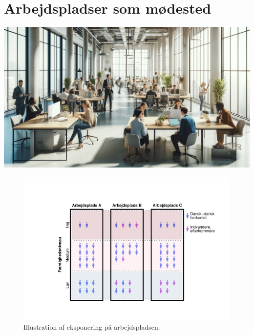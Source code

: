 \documentclass[
]{book}
\begin{document}
\chapter{Arbejdspladser som mødested}\label{kap4}

\includegraphics[width=1\linewidth]{images/dalle-work}

\begin{figure}
\includegraphics[width=1\linewidth]{en-befolkning-blander-sig_files/figure-latex/fig-0-1} \caption{Illustration af eksponering på arbejdspladsen.}\label{fig:fig-0}
\end{figure}
\end{document}
